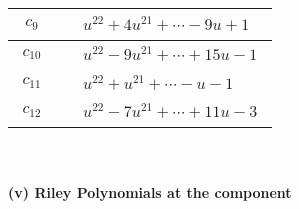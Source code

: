 \documentclass[1p]{elsarticle_modified}
\theoremstyle{definition}
\begin{document}
\begin{tabular}{m{50pt}|m{274pt}}
\hline $$\begin{aligned}c_{9}\end{aligned}$$&$\begin{aligned}
&u^{22}+4 u^{21}+\cdots-9 u+1
\end{aligned}$\\
\hline $$\begin{aligned}c_{10}\end{aligned}$$&$\begin{aligned}
&u^{22}-9 u^{21}+\cdots+15 u-1
\end{aligned}$\\
\hline $$\begin{aligned}c_{11}\end{aligned}$$&$\begin{aligned}
&u^{22}+u^{21}+\cdots- u-1
\end{aligned}$\\
\hline $$\begin{aligned}c_{12}\end{aligned}$$&$\begin{aligned}
&u^{22}-7 u^{21}+\cdots+11 u-3
\end{aligned}$\\
\hline
\end{tabular}\\~\\
\newpage\renewcommand{\arraystretch}{1}
\flushleft \textbf{(v) Riley Polynomials at the component}\newline \\
\end{document}
